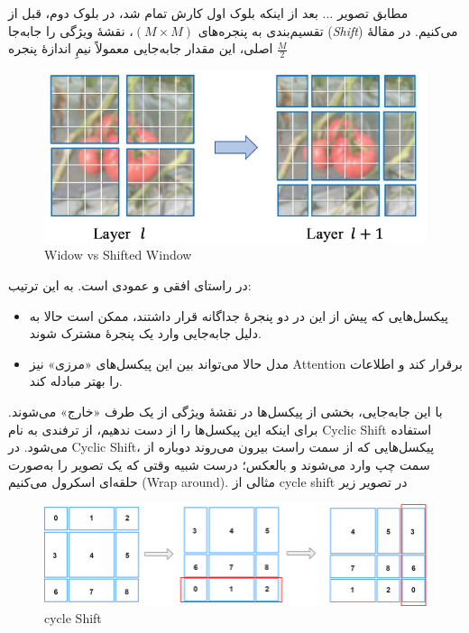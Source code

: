  مطابق تصویر ... بعد از اینکه بلوک اول کارش تمام شد، در بلوک دوم، قبل از تقسیم‌بندی به پنجره‌های 
\(\displaystyle (M \times M)\)، نقشهٔ ویژگی را جابه‌جا (\textit{Shift}) می‌کنیم. 
در مقالهٔ اصلی، این مقدار جابه‌جایی معمولاً نیمِ اندازهٔ پنجره 
\(\displaystyle \frac{M}{2}\) 


\begin{figure}[h]
	\centering
	\begin{minipage}[b]{1\textwidth}
		\centering
		\includegraphics[width=\textwidth]{transformer_images/local_window_with_shifted_local_window.png}
		\caption{Widow vs Shifted Window}
		\label{fig:window vs Shifted Window in Swin Transformer}
	\end{minipage}
	\hfill
	
\end{figure}
در راستای افقی و عمودی است. به این ترتیب:

\begin{itemize}
	\item پیکسل‌هایی که پیش از این در دو پنجرهٔ جداگانه قرار داشتند، ممکن است حالا به دلیل جابه‌جایی وارد یک پنجرهٔ مشترک شوند.
	\item مدل حالا می‌تواند بین این پیکسل‌های «مرزی» نیز Attention برقرار کند و اطلاعات را بهتر مبادله کند.
\end{itemize}

با این جابه‌جایی، بخشی از پیکسل‌ها در نقشهٔ ویژگی از یک طرف «خارج» می‌شوند. برای اینکه این پیکسل‌ها را از دست ندهیم، از ترفندی به نام Cyclic Shift استفاده می‌شود. در Cyclic Shift، پیکسل‌هایی که از سمت راست بیرون می‌روند دوباره از سمت چپ وارد می‌شوند و بالعکس؛ درست شبیه وقتی که یک تصویر را به‌صورت حلقه‌ای اسکرول می‌کنیم (Wrap around). 
مثالی از cycle shift  در تصویر زیر 



\begin{figure}[h]
	\centering
	\begin{minipage}[b]{1\textwidth}
		\centering
		\includegraphics[width=\textwidth]{transformer_images/cycle_shift.png}
		\caption{cycle Shift}
		\label{fig:Cycle Shift in Swin Tranformer}
	\end{minipage}
	\hfill
	
\end{figure}


